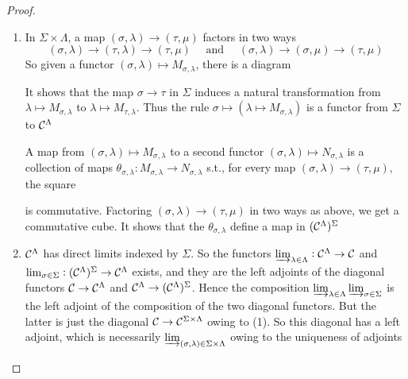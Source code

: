 \documentclass[11pt]{article}
\begin{document}
\begin{proof}
\begin{enumerate}
\item In \(\Sigma\times\Lambda\), a map \((\sigma,\lambda)\to(\tau,\mu)\) factors in two ways
\begin{equation*}
(\sigma,\lambda)\to(\tau,\lambda)\to(\tau,\mu)\quad\text{ and }\quad
(\sigma,\lambda)\to(\sigma,\mu)\to(\tau,\mu)
\end{equation*}
So given a functor \((\sigma,\lambda)\mapsto M_{\sigma,\lambda}\), there is a diagram
\begin{center}
\end{center}
It shows that the map \(\sigma\to\tau\) in \(\Sigma\) induces a natural
transformation from \(\lambda\mapsto M_{\sigma,\lambda}\) to \(\lambda\mapsto
      M_{\tau,\lambda}\). Thus the rule \(\sigma\mapsto(\lambda\mapsto M_{\sigma,\lambda})\) is a
functor from \(\Sigma\) to \(\mathcal{C}^\Lambda\)

A map from \((\sigma,\lambda)\mapsto M_{\sigma,\lambda}\) to a second functor \((\sigma,\lambda)\mapsto
      N_{\sigma,\lambda}\) is a collection of maps \(\theta_{\sigma,\lambda}:M_{\sigma,\lambda}\to N_{\sigma,\lambda}\)
s.t., for every map \((\sigma,\lambda)\to(\tau,\mu)\), the square
\begin{center}
\end{center}
is commutative. Factoring \((\sigma,\lambda)\to(\tau,\mu)\) in two ways as above, we get a
commutative cube. It shows that the \(\theta_{\sigma,\lambda}\) define a map in \((\mathcal{C}^\Lambda)^\Sigma\)

\item \(\mathcal{C}^\Lambda\) has direct limits indexed by \(\Sigma\). So the functors
\(\varinjlim_{\lambda\in\Lambda}:\mathcal{C}^\Lambda\to\mathcal{C}\) and
\(\lim_{\sigma\in\Sigma}:(\mathcal{C}^\Lambda)^\Sigma\to \mathcal{C}^\Lambda\) exists, and
they are the left adjoints of the diagonal functors
\(\mathcal{C}\to\mathcal{C}^\Lambda\) and \(\mathcal{C}^\Lambda\to(\mathcal{C}^\Lambda)^\Sigma\). Hence
the composition
\(\varinjlim_{\lambda\in\Lambda}\varinjlim_{\sigma\in\Sigma}\) is the left
adjoint of the composition of the two diagonal functors. But the latter is
just the diagonal \(\mathcal{C}\to\mathcal{C}^{\Sigma\times\Lambda}\) owing to (1). So
this diagonal has a left adjoint, which is necessarily
\(\varinjlim_{(\sigma,\lambda)\in\Sigma\times\Lambda}\) owing to the uniqueness of adjoints
\end{enumerate}
\end{proof}
\end{document}
